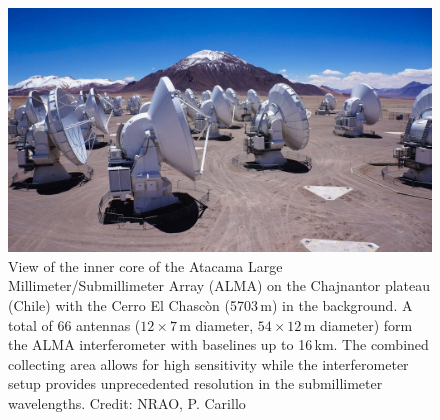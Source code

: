 \begin{figure}
    \centering
    \includegraphics[width=\textwidth]{images/chapters/introduction/ism/ALMA_ACA_PCarrillo.pdf}
    \caption[Atacama Large Millimeter/Submillimeter Array]{View of the inner core of the Atacama Large Millimeter/Submillimeter Array (ALMA) on the Chajnantor plateau (Chile) with the Cerro El Chasc\`on (5703\,m) in the background. A total of 66 antennas ($12 \times 7$\,m diameter, $54 \times 12$\,m diameter) form the ALMA interferometer with baselines up to 16\,km. The combined collecting area allows for high sensitivity while the interferometer setup provides unprecedented resolution in the submillimeter wavelengths.
    Credit: NRAO, P. Carillo}
    \label{introduction: figure: ALMA}
\end{figure}


